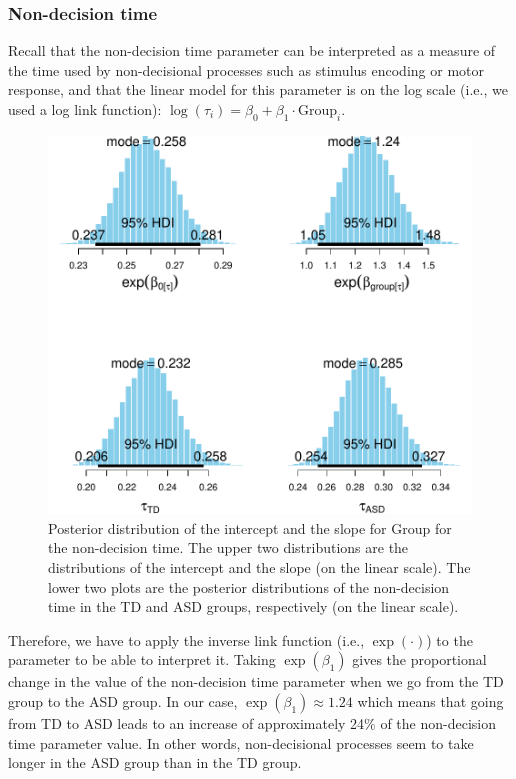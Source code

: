 \documentclass[
  11pt,
  english,
  ,doc,floatsintext]{apa6}
\begin{document}
\newpage

\hypertarget{non-decision-time}{%
\subsubsection{Non-decision time}\label{non-decision-time}}

Recall that the non-decision time parameter can be interpreted as a measure of the time used by non-decisional processes such as stimulus encoding or motor response, and that the linear model for this parameter is on the log scale (i.e., we used a log link function): \(\log(\tau_{i}) = \beta_{0} + \beta_{1} \cdot \text{Group}_{i}\).

\begin{figure}[!htb]

{\centering \includegraphics[width=0.75\linewidth]{supplementary_materials_files/figure-latex/posterior-ndt-1} 

}

\caption{Posterior distribution of the intercept and the slope for Group for the non-decision time. The upper two distributions are the distributions of the intercept and the slope (on the linear scale). The lower two plots are the posterior distributions of the non-decision time in the TD and ASD groups, respectively (on the linear scale).}\label{fig:posterior-ndt}
\end{figure}

Therefore, we have to apply the inverse link function (i.e., \(\exp(\cdot)\)) to the parameter to be able to interpret it. Taking \(\exp(\beta_{1})\) gives the proportional change in the value of the non-decision time parameter when we go from the TD group to the ASD group. In our case, \(\exp(\beta_{1}) \approx 1.24\) which means that going from TD to ASD leads to an increase of approximately 24\% of the non-decision time parameter value. In other words, non-decisional processes seem to take longer in the ASD group than in the TD group.
\end{document}
